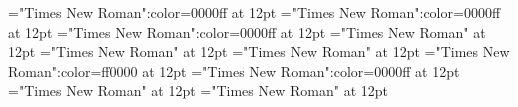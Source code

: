 \documentclass[a4paper]{article}
\begin{document}
 
\thispagestyle{empty} 
\font\examplesensearticlesectionletter="Times New Roman":color=0000ff at 12pt
\font\exampleusefirstoftypelastoftypesensearticlesectionletter="Times New Roman":color=0000ff at 12pt
\font\firstoftypegrammarcategorylastoftypesensearticlesectionletter="Times New Roman":color=0000ff at 12pt
\font\firstoftypelastoftypestressfirstoftypelastoftypepronunciationarticlesectionletter="Times New Roman" at 12pt
\font\firstoftypelastoftypepronunciationarticlesectionletter="Times New Roman" at 12pt
\font\firstoftypeheadwordlastoftypesectionletter="Times New Roman" at 12pt
\font\sensebeforearticlesectionletter="Times New Roman":color=ff0000 at 12pt
\font\sensearticlesectionletter="Times New Roman":color=0000ff at 12pt
\font\articlesectionletter="Times New Roman" at 12pt
\font\sectionletter="Times New Roman" at 12pt

\end{document}
